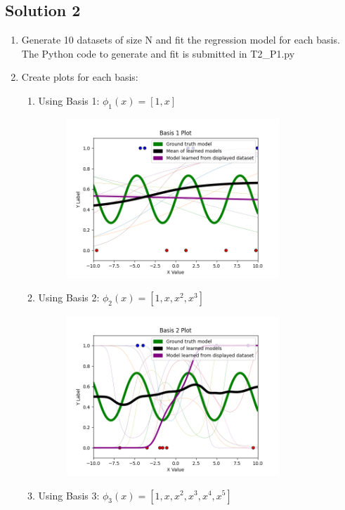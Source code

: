 \documentclass[submit]{harvardml}
\begin{document}
\subsection*{Solution 2}
\begin{enumerate}
    \item Generate 10 datasets of size N and fit the regression model for each basis.
    \\
    The Python code to generate and fit is submitted in T2\_P1.py
    \\
    \item Create plots for each basis:
    \begin{enumerate}
        \item Using Basis 1: $\phi_1(x) = [1, x]$
        \begin{figure}[H]
            \includegraphics[width=8cm]{hw2/P1_plots/Basis 1 Plot.png}
            \centering
        \end{figure}
        \item Using Basis 2: $\phi_2(x) = [1, x, x^2, x^3]$
        \begin{figure}[H]
            \includegraphics[width=8cm]{hw2/P1_plots/Basis 2 Plot.png}
            \centering
        \end{figure}
        \item Using Basis 3: $\phi_3(x) = [1, x, x^2, x^3, x^4, x^5]$
        \begin{figure}[H]

\end{figure}
\end{enumerate}
\end{enumerate}
\end{document}
